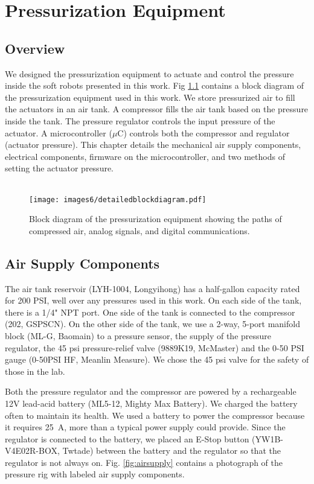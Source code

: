 \chapter{Pressurization Equipment}

\section{Overview}

We designed the pressurization equipment to actuate and control the pressure inside the soft robots presented in this work. Fig \ref{fig:blockdiagram} contains a block diagram of the pressurization equipment used in this work. We store pressurized air to fill the actuators in an air tank. A compressor fills the air tank based on the pressure inside the tank. The pressure regulator controls the input pressure of the actuator. A microcontroller ($\mu$C) controls both the compressor and regulator (actuator pressure). This chapter details the mechanical air supply components, electrical components, firmware on the microcontroller, and two methods of setting the actuator pressure. \\ \\

\begin{figure}[!ht]
    \centering
    \texttt{[image: images6/detailedblockdiagram.pdf]}
    \caption{Block diagram of the pressurization equipment showing the paths of compressed air, analog signals, and digital communications.}
    \label{fig:blockdiagram}
\end{figure}

\section{Air Supply Components}

The air tank reservoir (LYH-1004, Longyihong) has a half-gallon capacity rated for 200 PSI, well over any pressures used in this work. On each side of the tank, there is a 1/4" NPT port. One side of the tank is connected to the compressor (202, GSPSCN). On the other side of the tank, we use a 2-way, 5-port manifold block (ML-G, Baomain) to a pressure sensor, the supply of the pressure regulator, the 45 psi pressure-relief valve (9889K19, McMaster) and the 0-50 PSI gauge (0-50PSI HF, Meanlin Measure). We chose the 45 psi valve for the safety of those in the lab.

Both the pressure regulator and the compressor are powered by a rechargeable 12V lead-acid battery (ML5-12, Mighty Max Battery). We charged the battery often to maintain its health. We used a battery to power the compressor because it requires 25~A, more than a typical power supply could provide. Since the regulator is connected to the battery, we placed an E-Stop button (YW1B-V4E02R-BOX, Twtade) between the battery and the regulator so that the regulator is not always on. Fig. \ref{fig:airsupply} contains a photograph of the pressure rig with labeled air supply components. 

